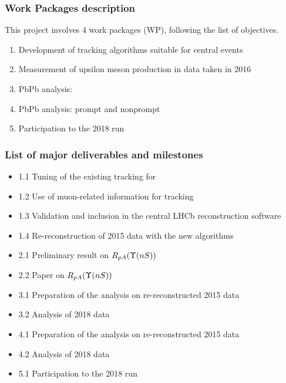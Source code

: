 \documentclass[a4paper,11pt]{article}
\begin{document}
\subsubsection*{Work Packages description}

This project involves 4 work packages (WP), following the list of objectives.

\begin{enumerate}
 \item Development of tracking algorithms suitable for central events
 \item Measurement of upsilon meson production in \pPb data taken in 2016
 \item PbPb analysis: \Dz 
 \item PbPb analysis: prompt and nonprompt \Jpsi
 \item Participation to the 2018 \PbPb run
\end{enumerate}


\subsubsection*{List of major deliverables and milestones}

\begin{itemize}
 \item 1.1 Tuning of the existing tracking for \pbpb
 \item 1.2 Use of muon-related information for \pbpb tracking
 \item 1.3 Validation and inclusion in the central LHCb reconstruction software
 \item 1.4 Re-reconstruction of 2015 data with the new algorithms
 \item 2.1 Preliminary result on $R_{pA} (\Upsilon(nS))$
 \item 2.2 Paper on $R_{pA} (\Upsilon(nS))$
 \item 3.1 Preparation of the \Dz analysis on re-reconstructed 2015 \pbpb data
 \item 3.2 Analysis of 2018 \pbpb data
 \item 4.1 Preparation of the \Jpsi analysis on re-reconstructed 2015 \pbpb data
 \item 4.2 Analysis of 2018 \pbpb data
 \item 5.1 Participation to the 2018 \pbpb run
\end{itemize}
\end{document}
